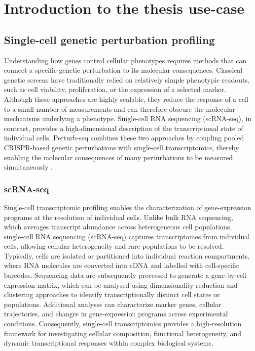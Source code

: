 \documentclass[11pt,a4paper]{article}
\begin{document}
\newpage

\section{Introduction to the thesis use-case}

\subsection{Single-cell genetic perturbation profiling}

Understanding how genes control cellular phenotypes requires methods that can
connect a specific genetic perturbation to its molecular consequences. Classical
genetic screens have traditionally relied on relatively simple phenotypic
readouts, such as cell viability, proliferation, or the expression of a selected
marker. Although these approaches are highly scalable, they reduce the response
of a cell to a small number of measurements and can therefore obscure the
molecular mechanisms underlying a phenotype. Single-cell RNA sequencing
(scRNA-seq), in contrast, provides a high-dimensional description of the
transcriptional state of individual cells. Perturb-seq combines these two
approaches by coupling pooled CRISPR-based genetic perturbations with
single-cell transcriptomics, thereby enabling the molecular consequences of
many perturbations to be measured simultaneously
\cite{dixit2016perturbseq}.

\subsubsection{scRNA-seq}

Single-cell transcriptomic profiling enables the characterization of gene-expression programs at the resolution of individual cells. Unlike bulk RNA sequencing, which averages transcript abundance across heterogeneous cell populations, single-cell RNA sequencing (scRNA-seq) captures transcriptomes from individual cells, allowing cellular heterogeneity and rare populations to be resolved. Typically, cells are isolated or partitioned into individual reaction compartments, where RNA molecules are converted into cDNA and labelled with cell-specific barcodes. Sequencing data are subsequently processed to generate a gene-by-cell expression matrix, which can be analysed using dimensionality-reduction and clustering approaches to identify transcriptionally distinct cell states or populations. Additional analyses can characterize marker genes, cellular trajectories, and changes in gene-expression programs across experimental conditions. Consequently, single-cell transcriptomics provides a high-resolution framework for investigating cellular composition, functional heterogeneity, and dynamic transcriptional responses within complex biological systems.
\end{document}
